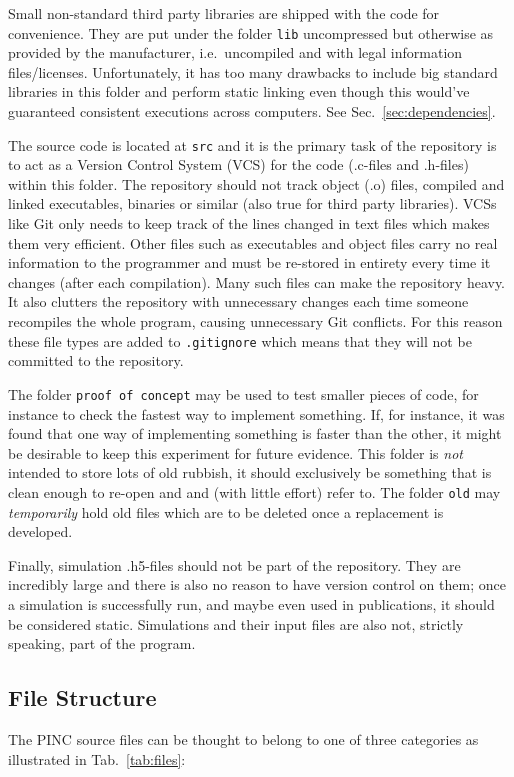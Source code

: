 \documentclass[10pt,a4paper]{article}
\newcommand{\refsec}[1]{Sec.~\ref{sec:#1}}
\newcommand{\reftab}[1]{Tab.~\ref{tab:#1}}
\begin{document}
Small non-standard third party libraries are shipped with the code for convenience. They are put under the folder \verb$lib$ uncompressed but otherwise as provided by the manufacturer, i.e.\ uncompiled and with legal information files/licenses. Unfortunately, it has too many drawbacks to include big standard libraries in this folder and perform static linking even though this would've guaranteed consistent executions across computers. See \refsec{dependencies}.

The source code is located at \verb$src$ and it is the primary task of the repository is to act as a Version Control System (VCS) for the code (.c-files and .h-files) within this folder. The repository should not track object (.o) files, compiled and linked executables, binaries or similar (also true for third party libraries). VCSs like Git only needs to keep track of the lines changed in text files which makes them very efficient. Other files such as executables and object files carry no real information to the programmer and must be re-stored in entirety every time it changes (after each compilation). Many such files can make the repository heavy. It also clutters the repository with unnecessary changes each time someone recompiles the whole program, causing unnecessary Git conflicts. For this reason these file types are added to \verb$.gitignore$ which means that they will not be committed to the repository.

The folder \verb$proof of concept$ may be used to test smaller pieces of code, for instance to check the fastest way to implement something. If, for instance, it was found that one way of implementing something is faster than the other, it might be desirable to keep this experiment for future evidence. This folder is \emph{not} intended to store lots of old rubbish, it should exclusively be something that is clean enough to re-open and and (with little effort) refer to. The folder \verb$old$ may \emph{temporarily} hold old files which are to be deleted once a replacement is developed.

Finally, simulation .h5-files should not be part of the repository. They are incredibly large and there is also no reason to have version control on them; once a simulation is successfully run, and maybe even used in publications, it should be considered static. Simulations and their input files are also not, strictly speaking, part of the program.

\subsection{File Structure}
The PINC source files can be thought to belong to one of three categories as illustrated in \reftab{files}:
\end{document}
